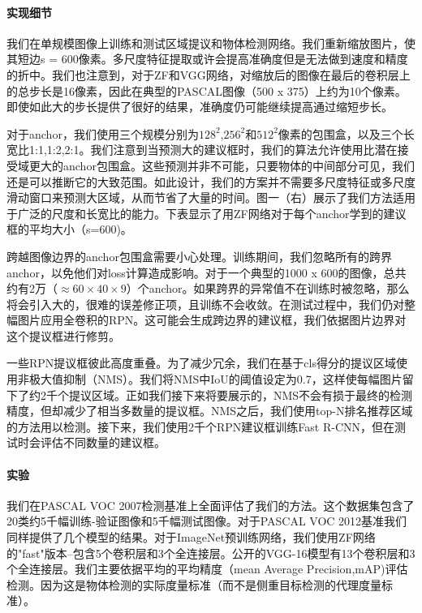 \documentclass[12pt,a4paper,titlepage]{article}
\begin{document}
\paragraph{实现细节}
我们在单规模图像上训练和测试区域提议和物体检测网络。我们重新缩放图片，使其短边s = 600像素。多尺度特征提取或许会提高准确度但是无法做到速度和精度的折中。我们也注意到，对于ZF和VGG网络，对缩放后的图像在最后的卷积层上的总步长是16像素，因此在典型的PASCAL图像（500 x 375）上约为10个像素。即使如此大的步长提供了很好的结果，准确度仍可能继续提高通过缩短步长。\par

对于anchor，我们使用三个规模分别为$128^2$,$256^2$和$512^2$像素的包围盒，以及三个长宽比1:1,1:2,2:1。我们注意到当预测大的建议框时，我们的算法允许使用比潜在接受域更大的anchor包围盒。这些预测并非不可能，只要物体的中间部分可见，我们还是可以推断它的大致范围。如此设计，我们的方案并不需要多尺度特征或多尺度滑动窗口来预测大区域，从而节省了大量的时间。图一（右）展示了我们方法适用于广泛的尺度和长宽比的能力。下表显示了用ZF网络对于每个anchor学到的建议框的平均大小（s=600)。\par

跨越图像边界的anchor包围盒需要小心处理。训练期间，我们忽略所有的跨界anchor，以免他们对loss计算造成影响。对于一个典型的1000 x 600的图像，总共约有2万（$ \approx 60 \times 40 \times 9$）个anchor。如果跨界的异常值不在训练时被忽略，那么将会引入大的，很难的误差修正项，且训练不会收敛。在测试过程中，我们仍对整幅图片应用全卷积的RPN。这可能会生成跨边界的建议框，我们依据图片边界对这个提议框进行修剪。\par

一些RPN提议框彼此高度重叠。为了减少冗余，我们在基于cls得分的提议区域使用非极大值抑制（NMS）。我们将NMS中IoU的阈值设定为0.7，这样使每幅图片留下了约2千个提议区域。正如我们接下来将要展示的，NMS不会有损于最终的检测精度，但却减少了相当多数量的提议框。NMS之后，我们使用top-N排名推荐区域的方法用以检测。接下来，我们使用2千个RPN建议框训练Fast R-CNN，但在测试时会评估不同数量的建议框。

\paragraph{实验}
我们在PASCAL VOC 2007检测基准上全面评估了我们的方法。这个数据集包含了20类约5千幅训练-验证图像和5千幅测试图像。对于PASCAL VOC 2012基准我们同样提供了几个模型的结果。对于ImageNet预训练网络，我们使用ZF网络的"fast"版本--包含5个卷积层和3个全连接层。公开的VGG-16模型有13个卷积层和3个全连接层。我们主要依据平均的平均精度（mean Average Precision,mAP)评估检测。因为这是物体检测的实际度量标准（而不是侧重目标检测的代理度量标准）。\par
\end{document}
